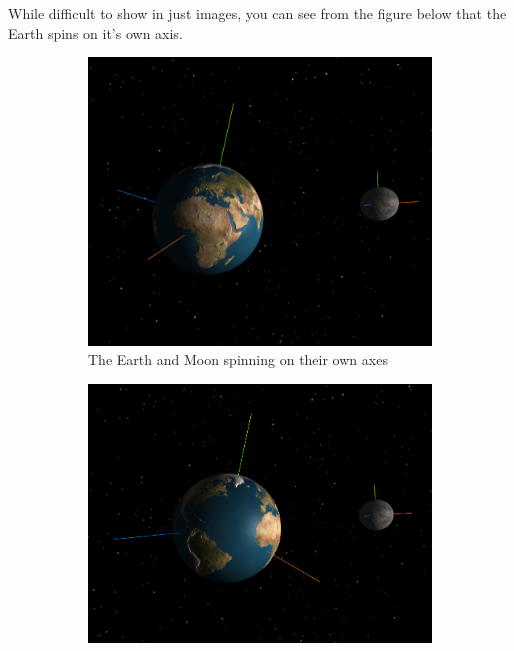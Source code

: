 \documentclass[12pt]{article}
\begin{document}
While difficult to show in just images, you can see from the figure below that the Earth spins on it's own axis.
\begin{figure}[H]
        \centering
        \begin{subfigure}[b]{0.4\textwidth}
                \includegraphics[width=\textwidth]{images/earthandmoonaxisspin1}
                \caption{The Earth and Moon spinning on their own axes}
                \label{fig: The axial spin of the Earth and moon.}
       \end{subfigure}
        \begin{subfigure}[b]{0.4\textwidth}
                \includegraphics[width=\textwidth]{images/earthandmoonaxisspin2}

\end{subfigure}
\end{figure}
\end{document}
